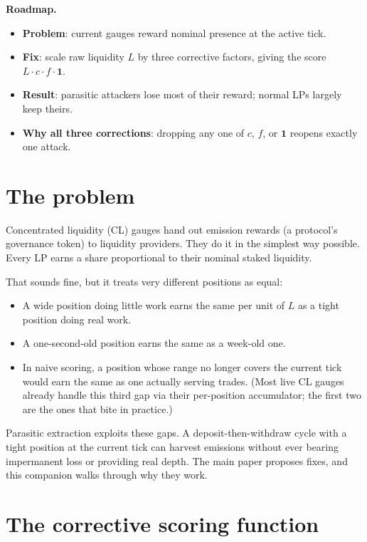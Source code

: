 \documentclass[11pt,a4paper]{article}
\begin{document}
\begin{result}
\textbf{Roadmap.}
\begin{itemize}[leftmargin=2em,nosep]
\item \textbf{Problem}: current gauges reward nominal presence at the active tick.
\item \textbf{Fix}: scale raw liquidity $L$ by three corrective factors, giving the score $L \cdot c \cdot f \cdot \mathbf{1}$.
\item \textbf{Result}: parasitic attackers lose most of their reward; normal LPs largely keep theirs.
\item \textbf{Why all three corrections}: dropping any one of $c$, $f$, or $\mathbf{1}$ reopens exactly one attack.
\end{itemize}
\end{result}

\section{The problem}

Concentrated liquidity (CL) gauges hand out emission rewards (a protocol's governance token) to liquidity providers. They do it in the simplest way possible. Every LP earns a share proportional to their nominal staked liquidity.

That sounds fine, but it treats very different positions as equal:

\begin{itemize}[leftmargin=2em]
\item A wide position doing little work earns the same per unit of $L$ as a tight position doing real work.
\item A one-second-old position earns the same as a week-old one.
\item In naive scoring, a position whose range no longer covers the current tick would earn the same as one actually serving trades. (Most live CL gauges already handle this third gap via their per-position accumulator; the first two are the ones that bite in practice.)
\end{itemize}

Parasitic extraction exploits these gaps. A deposit-then-withdraw cycle with a tight position at the current tick can harvest emissions without ever bearing impermanent loss or providing real depth. The main paper proposes fixes, and this companion walks through why they work.

\section{The corrective scoring function}
\end{document}
